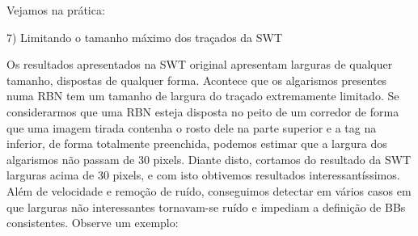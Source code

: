 \documentclass[10pt,twocolumn,letterpaper]{article}
\begin{document}
Vejamos na pr\'atica:

 \vspace{2\baselineskip}\vspace{-\parskip}
 \begin{minipage}{\linewidth}
 \centering
 \end{minipage}
 
 
 \vspace{2\baselineskip}\vspace{-\parskip}
 \begin{minipage}{\linewidth}
 \centering
 \end{minipage}
 
  
 \vspace{2\baselineskip}\vspace{-\parskip}
 \begin{minipage}{\linewidth}
 \centering
 \end{minipage} 

7) Limitando o tamanho m\'aximo dos tra\c{c}ados da SWT

Os resultados apresentados na SWT original apresentam larguras de qualquer tamanho, dispostas de qualquer forma. Acontece que 
os algarismos presentes numa RBN tem um tamanho de largura do tra\c{c}ado extremamente limitado. Se considerarmos que uma RBN 
esteja disposta no peito de um corredor de forma que uma imagem tirada contenha o rosto dele na parte superior e a tag na inferior, 
de forma totalmente preenchida, podemos estimar que a largura dos algarismos n\~ao passam de 30 pixels. Diante disto, cortamos do resultado 
da SWT larguras acima de 30 pixels, e com isto obtivemos resultados interessant\'issimos. Al\'em de velocidade e remo\c{c}\~ao 
de ru\'ido, conseguimos detectar em v\'arios casos em que larguras n\~ao interessantes tornavam-se ru\'ido e impediam a defini\c{c}\~ao 
de BBs consistentes. Observe um exemplo:
\end{document}
